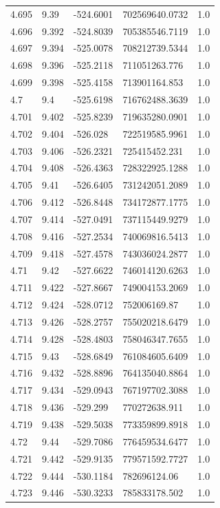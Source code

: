 \begin{tabular}{lllll}
4.695 & 9.39 & -524.6001 & 702569640.0732 & 1.0 \\
4.696 & 9.392 & -524.8039 & 705385546.7119 & 1.0 \\
4.697 & 9.394 & -525.0078 & 708212739.5344 & 1.0 \\
4.698 & 9.396 & -525.2118 & 711051263.776 & 1.0 \\
4.699 & 9.398 & -525.4158 & 713901164.853 & 1.0 \\
4.7 & 9.4 & -525.6198 & 716762488.3639 & 1.0 \\
4.701 & 9.402 & -525.8239 & 719635280.0901 & 1.0 \\
4.702 & 9.404 & -526.028 & 722519585.9961 & 1.0 \\
4.703 & 9.406 & -526.2321 & 725415452.231 & 1.0 \\
4.704 & 9.408 & -526.4363 & 728322925.1288 & 1.0 \\
4.705 & 9.41 & -526.6405 & 731242051.2089 & 1.0 \\
4.706 & 9.412 & -526.8448 & 734172877.1775 & 1.0 \\
4.707 & 9.414 & -527.0491 & 737115449.9279 & 1.0 \\
4.708 & 9.416 & -527.2534 & 740069816.5413 & 1.0 \\
4.709 & 9.418 & -527.4578 & 743036024.2877 & 1.0 \\
4.71 & 9.42 & -527.6622 & 746014120.6263 & 1.0 \\
4.711 & 9.422 & -527.8667 & 749004153.2069 & 1.0 \\
4.712 & 9.424 & -528.0712 & 752006169.87 & 1.0 \\
4.713 & 9.426 & -528.2757 & 755020218.6479 & 1.0 \\
4.714 & 9.428 & -528.4803 & 758046347.7655 & 1.0 \\
4.715 & 9.43 & -528.6849 & 761084605.6409 & 1.0 \\
4.716 & 9.432 & -528.8896 & 764135040.8864 & 1.0 \\
4.717 & 9.434 & -529.0943 & 767197702.3088 & 1.0 \\
4.718 & 9.436 & -529.299 & 770272638.911 & 1.0 \\
4.719 & 9.438 & -529.5038 & 773359899.8918 & 1.0 \\
4.72 & 9.44 & -529.7086 & 776459534.6477 & 1.0 \\
4.721 & 9.442 & -529.9135 & 779571592.7727 & 1.0 \\
4.722 & 9.444 & -530.1184 & 782696124.06 & 1.0 \\
4.723 & 9.446 & -530.3233 & 785833178.502 & 1.0 \\

\end{tabular}
